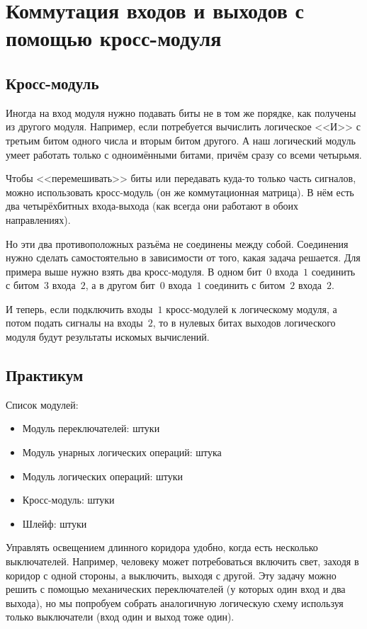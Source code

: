 \chapter{Коммутация входов и выходов с помощью кросс-модуля}

\section{Кросс-модуль}

Иногда на вход модуля нужно подавать биты не в том же порядке, как получены из другого модуля.
Например, если потребуется вычислить логическое <<И>> с третьим битом одного числа и вторым
битом другого. А наш логический модуль умеет работать только с одноимёнными битами,
причём сразу со всеми четырьмя.

Чтобы <<перемешивать>> биты или передавать куда-то только часть сигналов, можно использовать
кросс-модуль (он же коммутационная матрица). В нём есть два четырёхбитных входа-выхода
(как всегда они работают в обоих направлениях).

Но эти два противоположных разъёма не соединены между собой. Соединения нужно сделать самостоятельно
в зависимости от того, какая задача решается. Для примера выше нужно взять два кросс-модуля.
В одном бит~$0$ входа~$1$ соединить с битом~$3$ входа~$2$, а в другом
бит~$0$ входа~$1$ соединить с битом~$2$ входа~$2$.

И теперь, если подключить входы~$1$ кросс-модулей к логическому модуля,
а потом подать сигналы на входы~$2$, то в нулевых битах выходов логического модуля будут
результаты искомых вычислений.

\section{Практикум}

Список модулей:
\begin{itemize}
    \item Модуль переключателей:  штуки
    \item Модуль унарных логических операций:  штука
    \item Модуль логических операций:  штуки
    \item Кросс-модуль:  штуки
    \item Шлейф:  штуки
\end{itemize}


Управлять освещением длинного коридора удобно, когда есть несколько выключателей.
Например, человеку может потребоваться включить
свет, заходя в коридор с одной стороны, а выключить, выходя с другой.
Эту задачу можно решить с помощью механических переключателей (у которых один вход и два выхода),
но мы попробуем собрать аналогичную логическую схему используя только выключатели
(вход один и выход тоже один).

